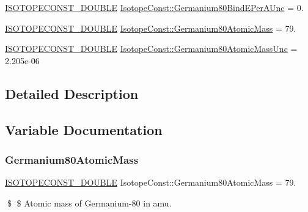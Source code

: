 \begin{DoxyCompactItemize}
\mbox{\hyperlink{group___isotope_const-_macros_ga8f45a7272ce02c0b4c65c44636ed719a}{I\+S\+O\+T\+O\+P\+E\+C\+O\+N\+S\+T\+\_\+\+D\+O\+U\+B\+LE}} \mbox{\hyperlink{group___isotope_const-_germanium-_ge80_gaa93a00342689c00bcd4d0a6d96925efc}{Isotope\+Const\+::\+Germanium80\+Bind\+E\+Per\+A\+Unc}} = 0.
\item 
\mbox{\hyperlink{group___isotope_const-_macros_ga8f45a7272ce02c0b4c65c44636ed719a}{I\+S\+O\+T\+O\+P\+E\+C\+O\+N\+S\+T\+\_\+\+D\+O\+U\+B\+LE}} \mbox{\hyperlink{group___isotope_const-_germanium-_ge80_gaed5659ed51f7826ca81be40241427b69}{Isotope\+Const\+::\+Germanium80\+Atomic\+Mass}} = 79.
\item 
\mbox{\hyperlink{group___isotope_const-_macros_ga8f45a7272ce02c0b4c65c44636ed719a}{I\+S\+O\+T\+O\+P\+E\+C\+O\+N\+S\+T\+\_\+\+D\+O\+U\+B\+LE}} \mbox{\hyperlink{group___isotope_const-_germanium-_ge80_ga09f94c576c21315280984173cdbaf13f}{Isotope\+Const\+::\+Germanium80\+Atomic\+Mass\+Unc}} = 2.\+205e-\/06
\end{DoxyCompactItemize}


\subsection{Detailed Description}


\subsection{Variable Documentation}
\mbox{\label{group___isotope_const-_germanium-_ge80_gaed5659ed51f7826ca81be40241427b69}} 
\subsubsection{\texorpdfstring{Germanium80\+Atomic\+Mass}{Germanium80AtomicMass}}
{\footnotesize\ttfamily \mbox{\hyperlink{group___isotope_const-_macros_ga8f45a7272ce02c0b4c65c44636ed719a}{I\+S\+O\+T\+O\+P\+E\+C\+O\+N\+S\+T\+\_\+\+D\+O\+U\+B\+LE}} Isotope\+Const\+::\+Germanium80\+Atomic\+Mass = 79.}

\$ \$ Atomic mass of Germanium-\/80 in amu. \mbox{\label{group___isotope_const-_germanium-_ge80_ga09f94c576c21315280984173cdbaf13f}} 
